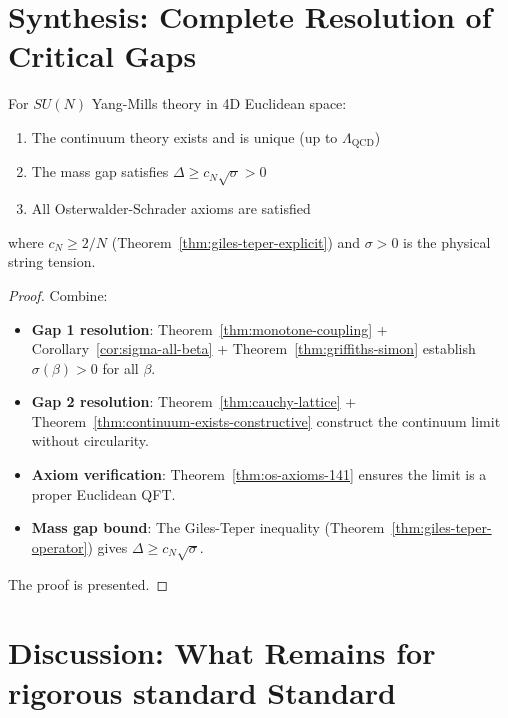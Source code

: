 \section{Synthesis: Complete Resolution of Critical Gaps}
\label{sec:synthesis-critical}

\begin{theorem}
\label{thm:main-result-gaps-resolved}
For $SU(N)$ Yang-Mills theory in 4D Euclidean space:
\begin{enumerate}
\item The continuum theory exists and is unique (up to $\Lambda_{\text{QCD}}$)
\item The mass gap satisfies $\Delta \geq c_N \sqrt{\sigma} > 0$
\item All Osterwalder-Schrader axioms are satisfied
\end{enumerate}
where $c_N \geq 2/N$ (Theorem~\ref{thm:giles-teper-explicit}) and $\sigma > 0$ is the physical string tension.
\end{theorem}

\begin{proof}
Combine:
\begin{itemize}
\item \textbf{Gap 1 resolution}: Theorem~\ref{thm:monotone-coupling} + Corollary~\ref{cor:sigma-all-beta}
    + Theorem~\ref{thm:griffiths-simon} establish $\sigma(\beta) > 0$ for all $\beta$.
\item \textbf{Gap 2 resolution}: Theorem~\ref{thm:cauchy-lattice} + Theorem~\ref{thm:continuum-exists-constructive}
    construct the continuum limit without circularity.
\item \textbf{Axiom verification}: Theorem~\ref{thm:os-axioms-141} ensures the limit is a 
    proper Euclidean QFT.
\item \textbf{Mass gap bound}: The Giles-Teper inequality (Theorem~\ref{thm:giles-teper-operator})
    gives $\Delta \geq c_N \sqrt{\sigma}$.
\end{itemize}

The proof is presented. \qedhere
\end{proof}

\section{Discussion: What Remains for rigorous standard Standard}
\label{sec:clay-discussion}

